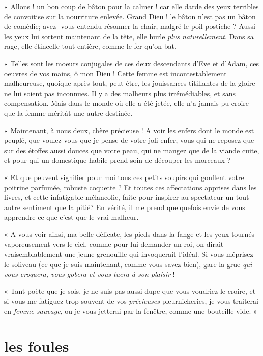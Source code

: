 « Allons ! un bon coup de bâton pour la calmer ! car elle darde des yeux
terribles de convoitise sur la nourriture enlevée. Grand Dieu ! le
bâton n’est pas un bâton de comédie; avez{}- vous
entendu résonner la chair, malgré le poil postiche ? Aussi les yeux lui
sortent maintenant de la tête, elle hurle \textit{plus naturellement}. Dans sa
rage, elle étincelle tout entière, comme le fer qu’on
bat.

« Telles sont les moeurs conjugales de ces deux descendants
d’Eve et d’Adam, ces oeuvres de vos
mains, ô mon Dieu ! Cette femme est incontestablement malheureuse,
quoique après tout, peut{}-être, les jouissances titillantes de la
gloire ne lui soient pas inconnues. Il y a des malheurs plus
irrémédiables, et sans compensation. Mais dans le monde où elle a été
jetée, elle n’a jamais pu croire que la femme méritât
une autre destinée.

« Maintenant, à nous deux, chère précieuse ! A voir les enfers dont le 
monde est peuplé, que voulez{}-vous que je pense de votre joli enfer,
vous qui ne reposez que sur des étoffes aussi douces que votre peau,
qui ne mangez que de la viande cuite, et pour qui un domestique habile
prend soin de découper les morceaux ?

« Et que peuvent signifier pour moi tous ces petits soupirs qui gonflent
votre poitrine parfumée, robuste coquette ? Et toutes ces affectations
apprises dans les livres, et cette infatigable mélancolie, faite pour inspirer au spectateur un tout autre
sentiment que la pitié? En vérité, il me prend quelquefois envie de
vous apprendre ce que c’est que le vrai malheur.

« A vous voir ainsi, ma belle délicate, les pieds dans la fange et les
yeux tournés vaporeusement vers le ciel, comme pour lui demander un
roi, on dirait vraisemblablement une jeune grenouille qui invoquerait
l’idéal. Si vous méprisez le soliveau (ce que je suis
maintenant, comme vous savez bien), gare la grue \textit{qui vous croquera,
vous gobera et vous tuera à son plaisir} !

« Tant poète que je sois, je ne suis pas aussi dupe que vous voudriez le
croire, et si vous me fatiguez trop souvent de vos \textit{précieuses}
pleurnicheries, je vous traiterai en \textit{femme sauvage}, ou je vous jetterai
par la fenêtre, comme une bouteille vide. »

\quebra\section[Les foules]{les foules}

